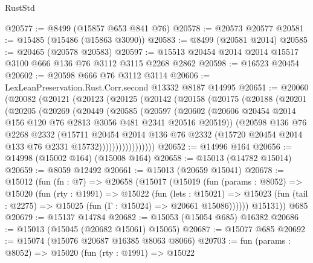 \begin{lexlean}{RustStd}
\begin{coremodule}
@20577 := @8499 (@15857 @653 @841 @76)
@20578 := @20573 @20577
@20581 := @15485 (@15486 (@15863 @3090))
@20583 := @8499 (@20581 @2014)
@20585 := @20465 (@20578 @20583)
@20597 := @15513 @20454 @2014 @2014 @15517 @3100 @666 @136 @76 @3112 @3115 @2268 @2862
@20598 := @16523 @20454
@20602 := @20598 @666 @76 @3112 @3114
@20606 := LexLeanPreservation.Rust.Corr.second @13332 @8187 @14995
@20651 := @20060
    (@20082
      (@20121
        (@20123
          (@20125
            (@20142
              (@20158
                (@20175
                  (@20188
                    (@20201
                      (@20205
                        (@20269
                          (@20449
                            (@20585
                              (@20597
                                (@20602
                                  (@20606
                                    @20454
                                    @2014
                                    @156
                                    @120
                                    @76
                                    @2813
                                    @3056
                                    @481
                                    @2341
                                    @20516
                                    @20519))
                                (@20598
                                  @136
                                  @76
                                  @2268
                                  @2332
                                  (@15711
                                    @20454
                                    @2014
                                    @136
                                    @76
                                    @2332
                                    (@15720 @20454 @2014 @133 @76 @2331 @15732)))))))))))))))))
@20652 := @14996 @164
@20656 := @14998 (@15002 @164) (@15008 @164)
@20658 := @15013 (@14782 @15014)
@20659 := @8059 @12492
@20661 := @15013 (@20659 @15041)
@20678 := @15012
    (fun (fn : @7) =>
    @20658
      (@15017
        (@15019
          (fun (params : @8052) =>
          @15020
            (fun (rty : @1991) =>
            @15022
              (fun (lets : @15021) =>
              @15023 (fun (tail : @2275) => @15025 (fun (Γ : @15024) => @20661 @15086))))))
        @15131))
    @685
@20679 := @15137 @14784
@20682 := @15053 (@15054 @685) @16382
@20686 := @15013 (@15045 (@20682 @15061) @15065)
@20687 := @15077 @685
@20692 := @15074 (@15076 @20687 @16385 @8063 @8066)
@20703 := fun (params : @8052) =>
  @15020
    (fun (rty : @1991) =>
    @15022

\end{coremodule}
\end{lexlean}
